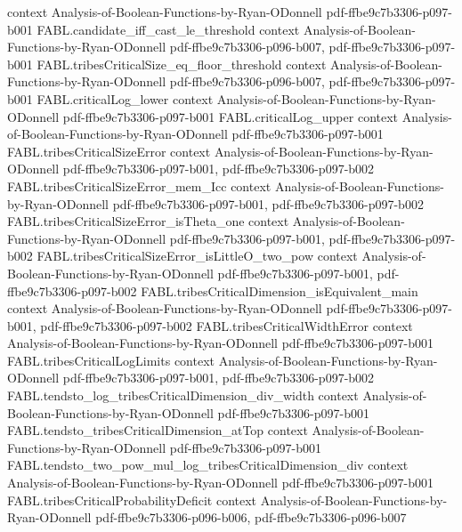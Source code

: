 \begin{theorem}
  {context}
  {Analysis-of-Boolean-Functions-by-Ryan-ODonnell}
  {pdf-ffbe9c7b3306-p097-b001}
\proofstep
  {FABL.candidate_iff_cast_le_threshold}
  {context}
  {Analysis-of-Boolean-Functions-by-Ryan-ODonnell}
  {pdf-ffbe9c7b3306-p096-b007,
    pdf-ffbe9c7b3306-p097-b001}
\proofstep
  {FABL.tribesCriticalSize_eq_floor_threshold}
  {context}
  {Analysis-of-Boolean-Functions-by-Ryan-ODonnell}
  {pdf-ffbe9c7b3306-p096-b007,
    pdf-ffbe9c7b3306-p097-b001}
\proofstep
  {FABL.criticalLog_lower}
  {context}
  {Analysis-of-Boolean-Functions-by-Ryan-ODonnell}
  {pdf-ffbe9c7b3306-p097-b001}
\proofstep
  {FABL.criticalLog_upper}
  {context}
  {Analysis-of-Boolean-Functions-by-Ryan-ODonnell}
  {pdf-ffbe9c7b3306-p097-b001}
\proofstep
  {FABL.tribesCriticalSizeError}
  {context}
  {Analysis-of-Boolean-Functions-by-Ryan-ODonnell}
  {pdf-ffbe9c7b3306-p097-b001,
    pdf-ffbe9c7b3306-p097-b002}
\proofstep
  {FABL.tribesCriticalSizeError_mem_Icc}
  {context}
  {Analysis-of-Boolean-Functions-by-Ryan-ODonnell}
  {pdf-ffbe9c7b3306-p097-b001,
    pdf-ffbe9c7b3306-p097-b002}
\proofstep
  {FABL.tribesCriticalSizeError_isTheta_one}
  {context}
  {Analysis-of-Boolean-Functions-by-Ryan-ODonnell}
  {pdf-ffbe9c7b3306-p097-b001,
    pdf-ffbe9c7b3306-p097-b002}
\proofstep
  {FABL.tribesCriticalSizeError_isLittleO_two_pow}
  {context}
  {Analysis-of-Boolean-Functions-by-Ryan-ODonnell}
  {pdf-ffbe9c7b3306-p097-b001,
    pdf-ffbe9c7b3306-p097-b002}
\proofstep
  {FABL.tribesCriticalDimension_isEquivalent_main}
  {context}
  {Analysis-of-Boolean-Functions-by-Ryan-ODonnell}
  {pdf-ffbe9c7b3306-p097-b001,
    pdf-ffbe9c7b3306-p097-b002}
\proofstep
  {FABL.tribesCriticalWidthError}
  {context}
  {Analysis-of-Boolean-Functions-by-Ryan-ODonnell}
  {pdf-ffbe9c7b3306-p097-b001}
\proofstep
  {FABL.tribesCriticalLogLimits}
  {context}
  {Analysis-of-Boolean-Functions-by-Ryan-ODonnell}
  {pdf-ffbe9c7b3306-p097-b001,
    pdf-ffbe9c7b3306-p097-b002}
\proofstep
  {FABL.tendsto_log_tribesCriticalDimension_div_width}
  {context}
  {Analysis-of-Boolean-Functions-by-Ryan-ODonnell}
  {pdf-ffbe9c7b3306-p097-b001}
\proofstep
  {FABL.tendsto_tribesCriticalDimension_atTop}
  {context}
  {Analysis-of-Boolean-Functions-by-Ryan-ODonnell}
  {pdf-ffbe9c7b3306-p097-b001}
\proofstep
  {FABL.tendsto_two_pow_mul_log_tribesCriticalDimension_div}
  {context}
  {Analysis-of-Boolean-Functions-by-Ryan-ODonnell}
  {pdf-ffbe9c7b3306-p097-b001}
\proofstep
  {FABL.tribesCriticalProbabilityDeficit}
  {context}
  {Analysis-of-Boolean-Functions-by-Ryan-ODonnell}
  {pdf-ffbe9c7b3306-p096-b006,
    pdf-ffbe9c7b3306-p096-b007}
\proofstep

\end{theorem}
